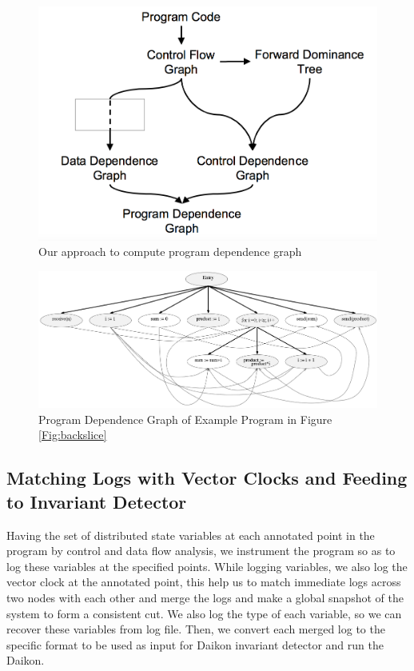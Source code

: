 \begin{figure}
\centering
  \includegraphics[scale=0.3]{images/PDG-approach.png}
  \caption{Our approach to compute program dependence graph}
  \label{fig:pdg}
\end{figure}


\begin{figure}
  \includegraphics[width=\columnwidth,scale=0.5]{images/pdg.png}
  \caption{Program Dependence Graph of Example Program in Figure \ref{Fig:backslice} \cite{Tip}}
  \label{fig:expdg}
\end{figure}


\subsection{Matching Logs with Vector Clocks and Feeding to Invariant Detector}

Having the set of distributed state variables at each annotated point in the program by control and data flow analysis, we instrument the program so as to log these variables at the specified points. While logging variables, we also log the vector clock at the annotated point, this help us to match immediate logs across two nodes with each other and merge the logs and make a global snapshot of the system to form a consistent cut. We also log the type of each variable, so we can recover these variables from log file. Then, we convert each merged log to the specific format to be used as input for Daikon invariant detector and run the Daikon.



